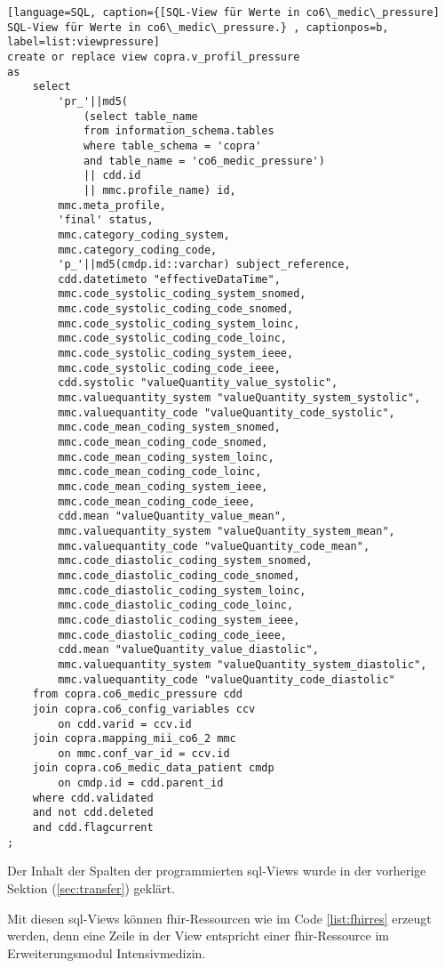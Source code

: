 \begin{lstlisting}[language=SQL, caption={[SQL-View für Werte in co6\_medic\_pressure] SQL-View für Werte in co6\_medic\_pressure.} , captionpos=b, label=list:viewpressure]
create or replace view copra.v_profil_pressure 
as
	select 
		'pr_'||md5(
			(select table_name 
			from information_schema.tables 
			where table_schema = 'copra'
			and table_name = 'co6_medic_pressure') 
			|| cdd.id 
			|| mmc.profile_name) id,
		mmc.meta_profile,
		'final' status,
		mmc.category_coding_system,
		mmc.category_coding_code,  
		'p_'||md5(cmdp.id::varchar) subject_reference,
		cdd.datetimeto "effectiveDataTime",
		mmc.code_systolic_coding_system_snomed,
		mmc.code_systolic_coding_code_snomed,
		mmc.code_systolic_coding_system_loinc,
		mmc.code_systolic_coding_code_loinc,
		mmc.code_systolic_coding_system_ieee,
		mmc.code_systolic_coding_code_ieee,
		cdd.systolic "valueQuantity_value_systolic",
		mmc.valuequantity_system "valueQuantity_system_systolic",
		mmc.valuequantity_code "valueQuantity_code_systolic",
		mmc.code_mean_coding_system_snomed,
		mmc.code_mean_coding_code_snomed,
		mmc.code_mean_coding_system_loinc,
		mmc.code_mean_coding_code_loinc,
		mmc.code_mean_coding_system_ieee,
		mmc.code_mean_coding_code_ieee,
		cdd.mean "valueQuantity_value_mean",
		mmc.valuequantity_system "valueQuantity_system_mean",
		mmc.valuequantity_code "valueQuantity_code_mean",
		mmc.code_diastolic_coding_system_snomed,
		mmc.code_diastolic_coding_code_snomed,
		mmc.code_diastolic_coding_system_loinc,
		mmc.code_diastolic_coding_code_loinc,
		mmc.code_diastolic_coding_system_ieee,
		mmc.code_diastolic_coding_code_ieee,
		cdd.mean "valueQuantity_value_diastolic",
		mmc.valuequantity_system "valueQuantity_system_diastolic",
		mmc.valuequantity_code "valueQuantity_code_diastolic"
	from copra.co6_medic_pressure cdd 
	join copra.co6_config_variables ccv 
		on cdd.varid = ccv.id 
	join copra.mapping_mii_co6_2 mmc 
		on mmc.conf_var_id = ccv.id 
	join copra.co6_medic_data_patient cmdp 
		on cmdp.id = cdd.parent_id 
	where cdd.validated 
	and not cdd.deleted 
	and cdd.flagcurrent
;
\end{lstlisting}

Der Inhalt der Spalten der programmierten \ac{sql}-Views wurde in der vorherige Sektion (\ref{sec:transfer}) geklärt. 

Mit diesen \ac{sql}-Views können \ac{fhir}-Ressourcen wie im Code \ref{list:fhirres} erzeugt werden, denn eine Zeile in der View entspricht einer \ac{fhir}-Ressource im Erweiterungsmodul \glqq Intensivmedizin\grqq{}.

